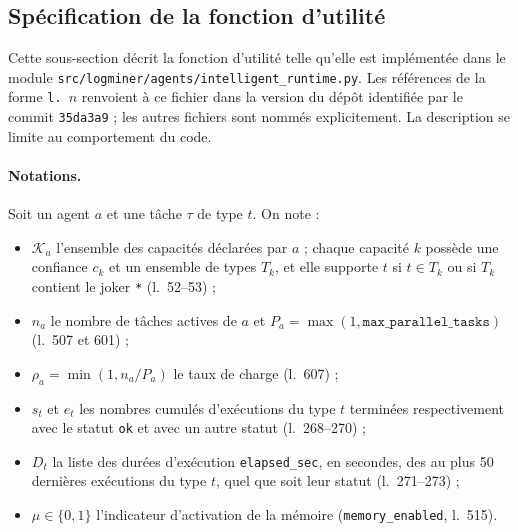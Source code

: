 
\subsection{Spécification de la fonction d'utilité}
\label{sec:spec-utilite}

Cette sous-section décrit la fonction d'utilité telle qu'elle est implémentée
dans le module \texttt{src/logminer/agents/intelligent\_runtime.py}. Les
références de la forme \texttt{l.~$n$} renvoient à ce fichier dans la version
du dépôt identifiée par le commit \texttt{35da3a9} ; les autres fichiers sont
nommés explicitement. La description se limite au comportement du code.

\paragraph{Notations.}
Soit un agent $a$ et une tâche $\tau$ de type $t$. On note :
\begin{itemize}
  \item $\mathcal{K}_a$ l'ensemble des capacités déclarées par $a$ ; chaque
  capacité $k$ possède une confiance $c_k$ et un ensemble de types $T_k$, et
  elle supporte $t$ si $t \in T_k$ ou si $T_k$ contient le joker
  \texttt{*} (l.~52--53) ;
  \item $n_a$ le nombre de tâches actives de $a$ et
  $P_a = \max(1, \texttt{max\_parallel\_tasks})$ (l.~507 et 601) ;
  \item $\rho_a = \min(1, n_a / P_a)$ le taux de charge (l.~607) ;
  \item $s_t$ et $e_t$ les nombres cumulés d'exécutions du type $t$ terminées
  respectivement avec le statut \texttt{ok} et avec un autre statut
  (l.~268--270) ;
  \item $D_t$ la liste des durées d'exécution \texttt{elapsed\_sec}, en
  secondes, des au plus 50 dernières exécutions du type $t$, quel que soit
  leur statut (l.~271--273) ;
  \item $\mu \in \{0, 1\}$ l'indicateur d'activation de la mémoire
  (\texttt{memory\_enabled}, l.~515).
\end{itemize}

